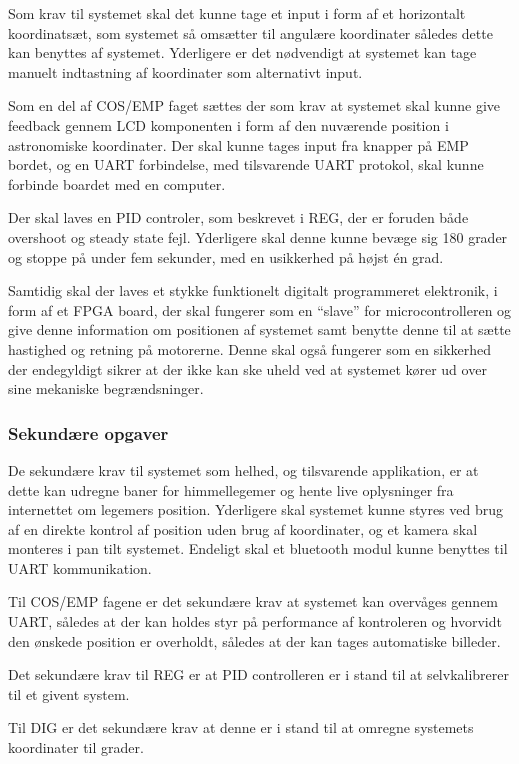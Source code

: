 Som krav til systemet skal det kunne tage et input i form af et horizontalt koordinatsæt, som systemet så omsætter til angulære koordinater således dette kan benyttes af systemet. Yderligere er det nødvendigt at systemet kan tage manuelt indtastning af koordinater som alternativt input.

Som en del af COS/EMP faget sættes der som krav at systemet skal kunne give feedback gennem LCD komponenten i form af den nuværende position i astronomiske koordinater. Der skal kunne tages input fra knapper på EMP bordet, og en UART forbindelse, med tilsvarende UART protokol, skal kunne forbinde boardet med en computer.

Der skal laves en PID controler, som beskrevet i REG, der er foruden både overshoot og steady state fejl. Yderligere skal denne kunne bevæge sig 180 grader og stoppe på under fem sekunder, med en usikkerhed på højst én grad.

Samtidig skal der laves et stykke funktionelt digitalt programmeret elektronik, i form af et FPGA board, der skal fungerer som en ``slave'' for microcontrolleren og give denne information om positionen af systemet samt benytte denne til at sætte hastighed og retning på motorerne. Denne skal også fungerer som en sikkerhed der endegyldigt sikrer at der ikke kan ske uheld ved at systemet kører ud over sine mekaniske begrændsninger.

\subsubsection{Sekundære opgaver}

De sekundære krav til systemet som helhed, og tilsvarende applikation, er at dette kan udregne baner for himmellegemer og hente live oplysninger fra internettet om legemers position. Yderligere skal systemet kunne styres ved brug af en direkte kontrol af position uden brug af koordinater, og et kamera skal monteres i pan tilt systemet. Endeligt skal et bluetooth modul kunne benyttes til UART kommunikation.

Til COS/EMP fagene er det sekundære krav at systemet kan overvåges gennem UART, således at der kan holdes styr på performance af kontroleren og hvorvidt den ønskede position er overholdt, således at der kan tages automatiske billeder.

Det sekundære krav til REG er at PID controlleren er i stand til at selvkalibrerer til et givent system.

Til DIG er det sekundære krav at denne er i stand til at omregne systemets koordinater til grader.